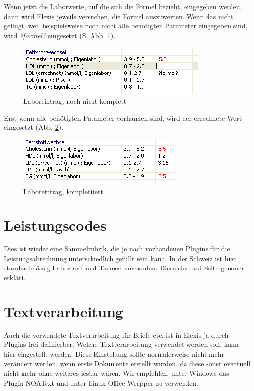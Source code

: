  Wenn jetzt die Laborwerte, auf die sich die Formel bezieht, eingegeben werden, dann wird Elexis jeweils versuchen, die Formel auszuwerten. Wenn das nicht gelingt, weil beispielsweise noch nicht alle benötigten Parameter eingegeben sind, wird \textit{?formel?} eingesetzt (S. Abb.  \ref{fig:labor4}).
\begin{figure}[htp]
\begin{center}
  \includegraphics{images/labor4}
  \caption{Laboreintrag, noch nicht komplett}
  \label{fig:labor4}
\end{center}
\end{figure}

Erst wenn alle benötigten Parameter vorhanden sind, wird der errechnete Wert eingesetzt (Abb. \ref{fig:labor5}).
\begin{figure}[htp]
\begin{center}
  \includegraphics{images/labor5}
  \caption{Laboreintrag, komplettiert}
  \label{fig:labor5}
\end{center}
\end{figure}

\section{Leistungscodes}
Dies ist wieder eine Sammelrubrik, die je nach vorhandenen Plugins für die Leistungsabrechnung unterschiedlich gefüllt sein kann. In der Schweiz ist hier standardmässig Labortarif und Tarmed vorhanden. Diese sind auf Seite \pageref{arzttarife} genauer erklärt.

\section{Textverarbeitung}
Auch die verwendete Textverarbeitung für Briefe etc. ist in Elexis ja durch Plugins frei definierbar. Welche Textverarbeitung verwendet werden soll, kann hier eingestellt werden. Diese Einstellung sollte normalerweise nicht mehr verändert werden, wenn erste Dokumente erstellt wurden, da diese sonst eventuell nicht mehr ohne weiteres lesbar wären. Wir empfehlen, unter Windows das Plugin NOAText und unter Linux Office-Wrapper zu verwenden.
